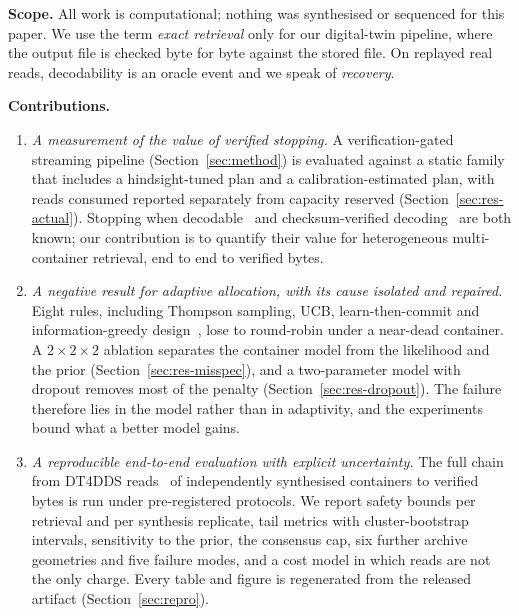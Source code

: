 \documentclass[conference,onecolumn,11pt]{IEEEtran}
\begin{document}
\textbf{Scope.}  All work is computational; nothing was synthesised or sequenced for this paper.  We use
the term \emph{exact retrieval} only for our digital-twin pipeline, where the output file is checked
byte for byte against the stored file.  On replayed real reads, decodability is an oracle event and we
speak of \emph{recovery}.

\textbf{Contributions.}
\begin{enumerate}
\item \emph{A measurement of the value of verified stopping.}  A verification-gated streaming pipeline
(Section~\ref{sec:method}) is evaluated against a static family that includes a hindsight-tuned plan
and a calibration-estimated plan, with reads consumed reported separately from capacity reserved
(Section~\ref{sec:res-actual}).  Stopping when decodable~\cite{lopez2019dna} and checksum-verified
decoding~\cite{erlich2017fountain} are both known; our contribution is to quantify their value for
heterogeneous multi-container retrieval, end to end to verified bytes.
\item \emph{A negative result for adaptive allocation, with its cause isolated and repaired.}  Eight
rules, including Thompson sampling, UCB, learn-then-commit and information-greedy
design~\cite{thompson1933likelihood,auer2002finite,garivier2016explore,chaloner1995bayesian}, lose to
round-robin under a near-dead container.  A $2\times2\times2$ ablation separates the container model
from the likelihood and the prior (Section~\ref{sec:res-misspec}), and a two-parameter model with dropout
removes most of the penalty (Section~\ref{sec:res-dropout}).  The failure therefore lies in the model
rather than in adaptivity, and the experiments bound what a better model gains.
\item \emph{A reproducible end-to-end evaluation with explicit uncertainty.}  The full chain from
DT4DDS reads~\cite{gimpel2023digital} of independently synthesised containers to verified bytes is run
under pre-registered protocols.  We report safety bounds per retrieval and per synthesis replicate, tail
metrics with cluster-bootstrap intervals, sensitivity to the prior, the consensus cap, six further
archive geometries and five failure modes, and a cost model in which reads are not the only charge.  Every
table and figure is regenerated from the released artifact (Section~\ref{sec:repro}).
\end{enumerate}

\end{document}
